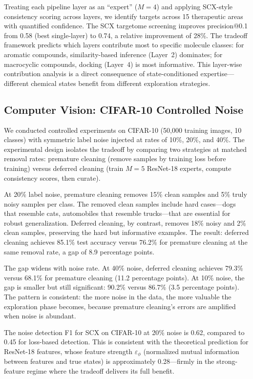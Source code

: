 \documentclass{article}
\begin{document}
Treating each pipeline layer as an ``expert'' ($M = 4$) and applying SCX-style consistency scoring across layers, we identify targets across 15 therapeutic areas with quantified confidence. The SCX targetome screening improves precision@0.1 from 0.58 (best single-layer) to 0.74, a relative improvement of 28\%. The tradeoff framework predicts which layers contribute most to specific molecule classes: for aromatic compounds, similarity-based inference (Layer~2) dominates; for macrocyclic compounds, docking (Layer~4) is most informative. This layer-wise contribution analysis is a direct consequence of state-conditioned expertise---different chemical states benefit from different exploration strategies.

\subsection{Computer Vision: CIFAR-10 Controlled Noise}
\label{sec:cifar}

We conducted controlled experiments on CIFAR-10 (50,000 training images, 10 classes) with symmetric label noise injected at rates of 10\%, 20\%, and 40\%. The experimental design isolates the tradeoff by comparing two strategies at matched removal rates: premature cleaning (remove samples by training loss before training) versus deferred cleaning (train $M = 5$ ResNet-18 experts, compute consistency scores, then curate).

At 20\% label noise, premature cleaning removes 15\% clean samples and 5\% truly noisy samples per class. The removed clean samples include hard cases---dogs that resemble cats, automobiles that resemble trucks---that are essential for robust generalization. Deferred cleaning, by contrast, removes 18\% noisy and 2\% clean samples, preserving the hard but informative examples. The result: deferred cleaning achieves 85.1\% test accuracy versus 76.2\% for premature cleaning at the same removal rate, a gap of 8.9 percentage points.

The gap widens with noise rate. At 40\% noise, deferred cleaning achieves 79.3\% versus 68.1\% for premature cleaning (11.2 percentage points). At 10\% noise, the gap is smaller but still significant: 90.2\% versus 86.7\% (3.5 percentage points). The pattern is consistent: the more noise in the data, the more valuable the exploration phase becomes, because premature cleaning's errors are amplified when noise is abundant.

The noise detection F1 for SCX on CIFAR-10 at 20\% noise is 0.62, compared to 0.45 for loss-based detection. This is consistent with the theoretical prediction for ResNet-18 features, whose feature strength $\varepsilon_\phi$ (normalized mutual information between features and true states) is approximately 0.28---firmly in the strong-feature regime where the tradeoff delivers its full benefit.
\end{document}
